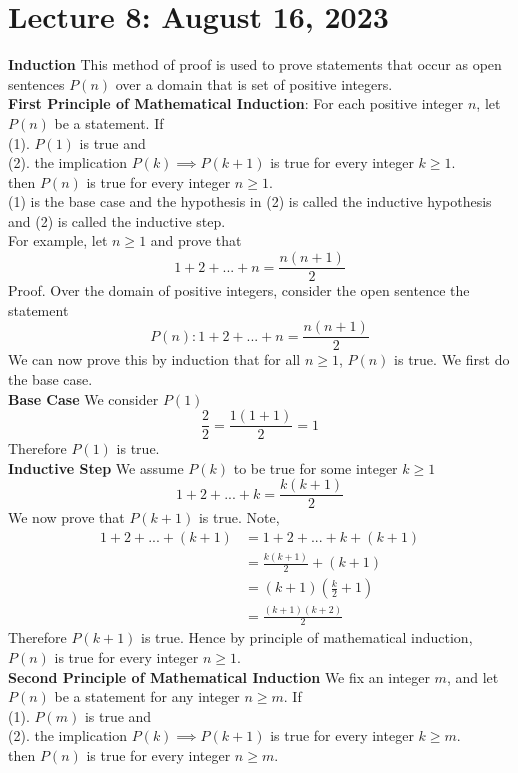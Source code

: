 \documentclass{article}
\begin{document}
\section{Lecture 8: August 16, 2023}
\textbf{Induction} This method of proof is used to prove statements that occur as open sentences \(P(n)\) over a domain that is set of positive integers.\\
\textbf{First Principle of Mathematical Induction}: For each positive integer \(n\), let \(P(n)\) be a statement. If\\
(1). \(P(1)\) is true and\\
(2). the implication \(P(k) \implies P(k+1)\) is true for every integer \(k \geq 1\).\\
then \(P(n)\) is true for every integer \(n \geq 1\).\\
(1) is the base case and the hypothesis in (2) is called the inductive hypothesis and (2) is called the inductive step.\\
For example, let \(n \geq 1\) and prove that 
\[1 + 2 + ... + n = \frac{n(n+1)}{2}\]
Proof. Over the domain of positive integers, consider the open sentence the statement 
\[P(n): 1 + 2 + ... + n = \frac{n(n+1)}{2} \]
We can now prove this by induction that for all \(n \geq 1\), \(P(n)\) is true. We first do the base case.\\
\textbf{Base Case} We consider \(P(1)\)
\[\frac{2}{2} = \frac{1(1+1)}{2} = 1\]
Therefore \(P(1)\) is true.\\
\textbf{Inductive Step} We assume \(P(k)\) to be true for some integer \(k \geq 1\)
\[1 + 2 + ... + k = \frac{k(k+1)}{2}\]
We now prove that \(P(k+1)\) is true. Note,
\begin{align*}
    1+2+...+(k+1)&= 1+2+...+k+(k+1)\\
    &= \frac{k(k+1)}{2}+(k+1)\\
    &= (k+1)(\frac{k}{2}+1)\\
    &=\frac{(k+1)(k+2)}{2}
\end{align*}
Therefore \(P(k+1)\) is true. Hence by principle of mathematical induction, \(P(n)\) is true for every integer \(n \geq 1\).\\
\textbf{Second Principle of Mathematical Induction} We fix an integer \(m\), and let \(P(n)\) be a statement for any integer \(n \geq m\). If \\
(1). \(P(m)\) is true and\\
(2). the implication \(P(k) \implies P(k+1)\) is true for every integer \(k \geq m\).\\
then \(P(n)\) is true for every integer \(n \geq m\).\\
\end{document}
